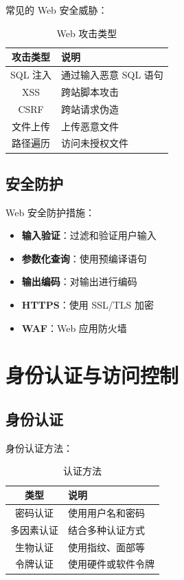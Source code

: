 \documentclass[12pt,UTF8]{ctexbook}
\begin{document}
常见的 Web 安全威胁：
\begin{table}[htbp]
    \centering
    \caption{Web 攻击类型}
    \begin{tabular}{|c|p{8cm}|}
        \hline
        \textbf{攻击类型} & \textbf{说明} \\
        \hline
        SQL 注入 & 通过输入恶意 SQL 语句 \\
        \hline
        XSS & 跨站脚本攻击 \\
        \hline
        CSRF & 跨站请求伪造 \\
        \hline
        文件上传 & 上传恶意文件 \\
        \hline
        路径遍历 & 访问未授权文件 \\
        \hline
    \end{tabular}
\end{table}

\section{安全防护}
\label{sec:web_protection}

Web 安全防护措施：
\begin{itemize}
    \item \textbf{输入验证}：过滤和验证用户输入
    \item \textbf{参数化查询}：使用预编译语句
    \item \textbf{输出编码}：对输出进行编码
    \item \textbf{HTTPS}：使用 SSL/TLS 加密
    \item \textbf{WAF}：Web 应用防火墙
\end{itemize}

\chapter{身份认证与访问控制}
\label{chap:authentication}

\section{身份认证}
\label{sec:authentication}

身份认证方法：
\begin{table}[htbp]
    \centering
    \caption{认证方法}
    \begin{tabular}{|c|p{8cm}|}
        \hline
        \textbf{类型} & \textbf{说明} \\
        \hline
        密码认证 & 使用用户名和密码 \\
        \hline
        多因素认证 & 结合多种认证方式 \\
        \hline
        生物认证 & 使用指纹、面部等 \\
        \hline
        令牌认证 & 使用硬件或软件令牌 \\
        \hline
    \end{tabular}
\end{table}
\end{document}

